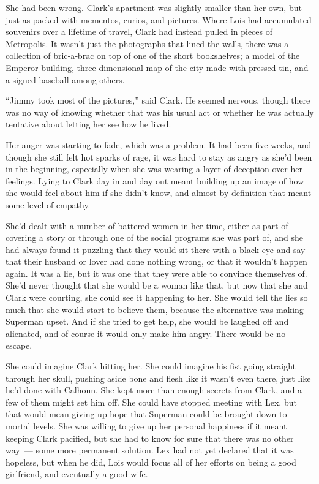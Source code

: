 \documentclass[ebook,12pt]{memoir}
\begin{document}
She had been wrong. Clark's apartment was slightly smaller than her own,
but just as packed with mementos, curios, and pictures. Where Lois had
accumulated souvenirs over a lifetime of travel, Clark had instead
pulled in pieces of Metropolis. It wasn't just the photographs that
lined the walls, there was a collection of bric‐a‐brac on top of one of
the short bookshelves; a model of the Emperor building,
three‐dimensional map of the city made with pressed tin, and a signed
baseball among others.

``Jimmy took most of the pictures,'' said Clark. He seemed nervous,
though there was no way of knowing whether that was his usual act or
whether he was actually tentative about letting her see how he lived.

Her anger was starting to fade, which was a problem. It had been five
weeks, and though she still felt hot sparks of rage, it was hard to stay
as angry as she'd been in the beginning, especially when she was wearing
a layer of deception over her feelings. Lying to Clark day in and day
out meant building up an image of how she would feel about him if she
didn't know, and almost by definition that meant some level of empathy.

She'd dealt with a number of battered women in her time, either as part
of covering a story or through one of the social programs she was part
of, and she had always found it puzzling that they would sit there with
a black eye and say that their husband or lover had done nothing wrong,
or that it wouldn't happen again. It was a lie, but it was one that they
were able to convince themselves of. She'd never thought that she would
be a woman like that, but now that she and Clark were courting, she
could see it happening to her. She would tell the lies so much that she
would start to believe them, because the alternative was making Superman
upset. And if she tried to get help, she would be laughed off and
alienated, and of course it would only make him angry. There would be no
escape.

She could imagine Clark hitting her. She could imagine his fist going
straight through her skull, pushing aside bone and flesh like it wasn't
even there, just like he'd done with Calhoun. She kept more than enough
secrets from Clark, and a few of them might set him off. She could have
stopped meeting with Lex, but that would mean giving up hope that
Superman could be brought down to mortal levels. She was willing to give
up her personal happiness if it meant keeping Clark pacified, but she
had to know for sure that there was no other way~--- some more permanent
solution. Lex had not yet declared that it was hopeless, but when he
did, Lois would focus all of her efforts on being a good girlfriend, and
eventually a good wife.
\end{document}
